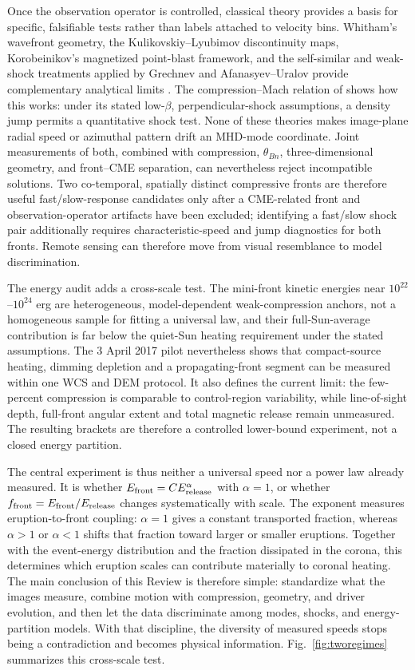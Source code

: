\documentclass[11pt]{article}
\let\parencite\citep
\let\textcite\citet
\newcommand{\Efront}{E_{\rm front}}
\newcommand{\Erelease}{E_{\rm release}}
\begin{document}
Once the observation operator is controlled, classical theory provides a basis for specific, falsifiable tests rather than labels attached to velocity bins. Whitham's wavefront geometry, the Kulikovskiy--Lyubimov discontinuity maps, Korobeinikov's magnetized point-blast framework, and the self-similar and weak-shock treatments applied by Grechnev and Afanasyev--Uralov provide complementary analytical limits \parencite{Whitham1974,KulikovskiyLyubimov1965,Korobeinikov1973,Grechnev2011,AfanasyevUralov2011}. The compression--Mach relation of \textcite{Vrsnak2002} shows how this works: under its stated low-$\beta$, perpendicular-shock assumptions, a density jump permits a quantitative shock test. None of these theories makes image-plane radial speed or azimuthal pattern drift an MHD-mode coordinate. Joint measurements of both, combined with compression, $\theta_{Bn}$, three-dimensional geometry, and front--CME separation, can nevertheless reject incompatible solutions. Two co-temporal, spatially distinct compressive fronts are therefore useful fast/slow-response candidates only after a CME-related front and observation-operator artifacts have been excluded; identifying a fast/slow shock pair additionally requires characteristic-speed and jump diagnostics for both fronts. Remote sensing can therefore move from visual resemblance to model discrimination.

The energy audit adds a cross-scale test. The mini-front kinetic energies near $10^{22}$--$10^{24}$ erg are heterogeneous, model-dependent weak-compression anchors, not a homogeneous sample for fitting a universal law, and their full-Sun-average contribution is far below the quiet-Sun heating requirement under the stated assumptions. The 3 April 2017 pilot nevertheless shows that compact-source heating, dimming depletion and a propagating-front segment can be measured within one WCS and DEM protocol. It also defines the current limit: the few-percent compression is comparable to control-region variability, while line-of-sight depth, full-front angular extent and total magnetic release remain unmeasured. The resulting brackets are therefore a controlled lower-bound experiment, not a closed energy partition.

The central experiment is thus neither a universal speed nor a power law already measured. It is whether $\Efront=C\Erelease^{\alpha}$ with $\alpha=1$, or whether $f_{\rm front}=\Efront/\Erelease$ changes systematically with scale. The exponent measures eruption-to-front coupling: $\alpha=1$ gives a constant transported fraction, whereas $\alpha>1$ or $\alpha<1$ shifts that fraction toward larger or smaller eruptions. Together with the event-energy distribution and the fraction dissipated in the corona, this determines which eruption scales can contribute materially to coronal heating. The main conclusion of this Review is therefore simple: standardize what the images measure, combine motion with compression, geometry, and driver evolution, and then let the data discriminate among modes, shocks, and energy-partition models. With that discipline, the diversity of measured speeds stops being a contradiction and becomes physical information. Fig.~\ref{fig:tworegimes} summarizes this cross-scale test.
\end{document}
